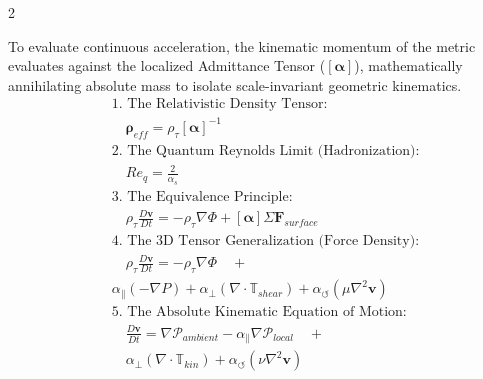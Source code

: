\documentclass[11pt, a4paper]{article}
\newcounter{cheatnum}
\begin{document}
\begin{multicols}{2}
\begin{tcolorbox}[cheatbox, title={\refstepcounter{cheatnum}\label{box:admittance_ns}\thecheatnum. Admittance-Modified Navier-Stokes \scriptsize\hfill\hyperref[sec:deriv_admittance_ns]{[Proof $\downarrow$]}}]
To evaluate continuous acceleration, the kinematic momentum of the metric evaluates against the localized Admittance Tensor ($[\boldsymbol{\alpha}]$), mathematically annihilating absolute mass to isolate scale-invariant geometric kinematics.
\begin{align}
    &\text{1. The Relativistic Density Tensor:} \nonumber \\
    &\quad \boldsymbol{\rho}_{eff} = \rho_{\tau} [\boldsymbol{\alpha}]^{-1} \label{eq:fluid_inertia_gradient} \\
    &\text{2. The Quantum Reynolds Limit (Hadronization):} \nonumber \\
    &\quad Re_q = \frac{2}{\alpha_s} \label{eq:quantum_reynolds} \\
    &\text{3. The Equivalence Principle:} \nonumber \\
    &\quad \rho_{\tau} \frac{D\mathbf{v}}{Dt} = -\rho_{\tau} \nabla \Phi + [\boldsymbol{\alpha}] \Sigma \mathbf{F}_{surface} \label{eq:admittance_ns} \\
    &\text{4. The 3D Tensor Generalization (Force Density):} \nonumber \\
    &\quad \rho_{\tau} \frac{D\mathbf{v}}{Dt} = -\rho_{\tau} \nabla \Phi \quad + \nonumber \\
    & \alpha_{\parallel}(-\nabla P) + \alpha_{\perp}(\nabla \cdot \mathbb{T}_{shear}) + \alpha_{\circlearrowleft}(\mu \nabla^2 \mathbf{v}) \label{eq:propulsion_master} \\
    &\text{5. The Absolute Kinematic Equation of Motion:} \nonumber \\
    &\quad \frac{D\mathbf{v}}{Dt} = \nabla \mathcal{P}_{ambient} - \alpha_{\parallel}\nabla \mathcal{P}_{local} \quad + \nonumber \\
    &\quad \alpha_{\perp}(\nabla \cdot \mathbb{T}_{kin}) + \alpha_{\circlearrowleft}(\nu \nabla^2 \mathbf{v}) \label{eq:kinematic_ns}
\end{align}
\end{tcolorbox}


\end{multicols}
\end{document}
